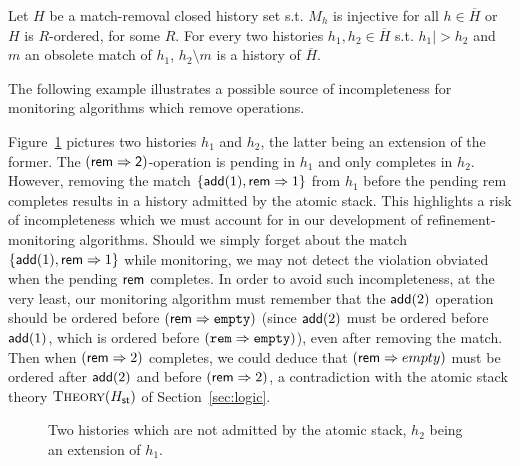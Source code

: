 \begin{corollary}\label{cor:matching_final}

Let $H$ be a match-removal closed history set 
s.t.
$M_h$ is injective for all $h\in \overline{H}$ or $H$ is $R$-ordered,
for some $R$.
For every two histories $h_1, h_2\in \overline{H}$ s.t. $h_1 |> h_2$ and
$m$ an obsolete match of $h_1$, 
$h_2\setminus m$ is a history of $\overline{H}$.

\end{corollary}

The following example illustrates a possible source of incompleteness for
monitoring algorithms which remove operations.

\begin{example}
  \label{ex:removal_no_saturation}

  Figure~\ref{fig:removal_no_saturation} pictures two histories $h_1$ and
  $h_2$, the latter being an extension of the former. The $(\sf rem =>
  2)$-operation is pending in $h_1$ and only completes in $h_2$. However,
  removing the match ${\{ {\sf add}(1), {\sf rem} => 1 \}}$ from $h_1$ before the
  pending {\sf rem} completes results in a history admitted by the atomic
  stack. This highlights a risk of incompleteness which we must account for in
  our development of refinement-monitoring algorithms. Should we simply forget
  about the match ${\{  {\sf add}(1), {\sf rem} => 1 \}}$ while monitoring, we
  may not detect the violation obviated when the pending ${\sf rem}$ completes.
  In order to avoid such incompleteness, at the very least, our monitoring
  algorithm must remember that the ${\sf add}(2)$ operation should be ordered
  before $({\sf rem} => {\tt empty})$ (since ${\sf add}(2)$ must be ordered
  before ${\sf add}(1)$, which is ordered before $({\tt rem} => {\tt empty})$),
  even after removing the match. Then when $({\sf rem} => 2)$ completes, we
  could deduce that $({\sf rem} => empty)$ must be ordered after ${\sf add}(2)$
  and before $({\sf rem} => 2)$, a contradiction with the atomic stack theory
  $\textsc{Theory}(H_{\sf st})$ of Section~\ref{sec:logic}.

\end{example}

\begin{figure}
  
  \caption{Two histories which are not admitted by the atomic stack, $h_2$
  being an extension of $h_1$.}
  \label{fig:removal_no_saturation}
\end{figure}
